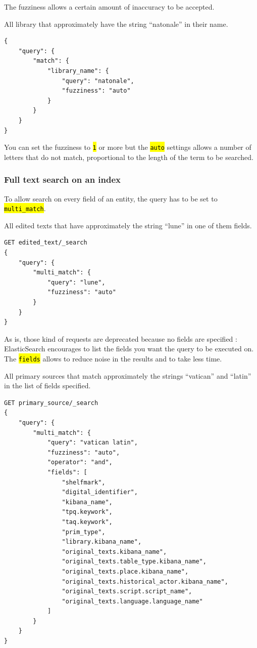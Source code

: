 \documentclass[a4paper,12pt,twoside]{book}
\let\OldTexttt\texttt
\renewcommand{\texttt}[1]{\OldTexttt{\hl{#1}}}
\let\quoteOld\quote
\let\endquoteOld\endquote
\renewenvironment{quote}{\small\quoteOld}{\endquoteOld}
\begin{document}
The fuzziness allows a certain amount of inaccuracy to be accepted.

\begin{quote}
	All library that approximately have the string ``natonale'' in their name.
\end{quote}

\begin{lstlisting}
{
    "query": {
        "match": {
            "library_name": {
                "query": "natonale",
                "fuzziness": "auto"
            }
        }
    }
}
\end{lstlisting}

You can set the fuzziness to \texttt{1} or more but the \texttt{auto} settings allows a number of letters that do not match, proportional to the length of the term to be searched.

			\subsubsection{Full text search on an index}\label{full-text-search-on-an-index}

To allow search on every field of an entity, the query has to be set to \texttt{multi\_match}.

\begin{quote}
	All edited texts that have approximately the string ``lune'' in one of them fields.
\end{quote}

\begin{lstlisting}
GET edited_text/_search
{
    "query": {
        "multi_match": {
            "query": "lune",
            "fuzziness": "auto"
        }
    }
}
\end{lstlisting}

As is, those kind of requests are deprecated because no fields are specified : ElasticSearch encourages to list the fields you want the query to be executed on. The \texttt{fields} allows to reduce noise in the results and to take less time.

\begin{quote}
	All primary sources that match approximately the strings ``vatican'' and ``latin'' in the list of fields specified.
\end{quote}

\begin{lstlisting}
GET primary_source/_search
{
    "query": {
        "multi_match": {
            "query": "vatican latin",
            "fuzziness": "auto",
            "operator": "and",
            "fields": [
                "shelfmark",
                "digital_identifier",
                "kibana_name",
                "tpq.keywork",
                "taq.keywork",
                "prim_type",
                "library.kibana_name",
                "original_texts.kibana_name",
                "original_texts.table_type.kibana_name",
                "original_texts.place.kibana_name",
                "original_texts.historical_actor.kibana_name",
                "original_texts.script.script_name",
                "original_texts.language.language_name"
            ]
        }
    }
}
\end{lstlisting}
\end{document}
